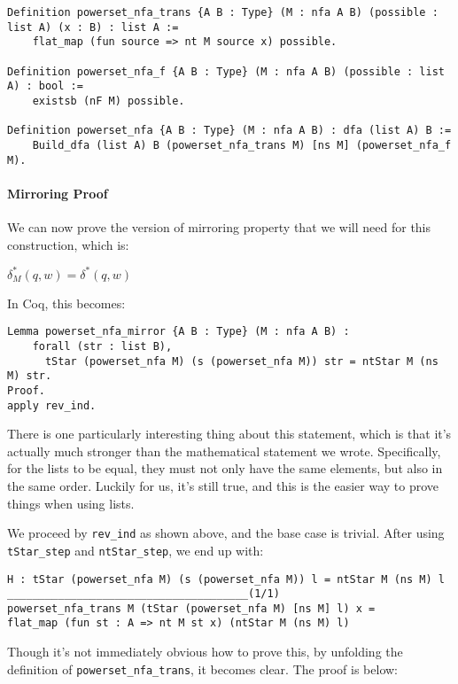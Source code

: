 \begin{verbatim}
Definition powerset_nfa_trans {A B : Type} (M : nfa A B) (possible : list A) (x : B) : list A :=
    flat_map (fun source => nt M source x) possible.

Definition powerset_nfa_f {A B : Type} (M : nfa A B) (possible : list A) : bool :=
    existsb (nF M) possible.

Definition powerset_nfa {A B : Type} (M : nfa A B) : dfa (list A) B :=
    Build_dfa (list A) B (powerset_nfa_trans M) [ns M] (powerset_nfa_f M).
\end{verbatim}

\paragraph{Mirroring Proof}

We can now prove the version of mirroring property that we will need for this construction, which is:

$\delta_M^*(q, w) = \delta^*(q, w)$

In Coq, this becomes:

\begin{verbatim}
Lemma powerset_nfa_mirror {A B : Type} (M : nfa A B) :
    forall (str : list B),
      tStar (powerset_nfa M) (s (powerset_nfa M)) str = ntStar M (ns M) str.
Proof.
apply rev_ind.
\end{verbatim}

There is one particularly interesting thing about this statement, which is that it's actually much stronger than the mathematical statement we wrote.
Specifically, for the lists to be equal, they must not only have the same elements, but also in the same order.
Luckily for us, it's still true, and this is the easier way to prove things when using lists.

We proceed by \texttt{rev_ind} as shown above, and the base case is trivial.
After using \texttt{tStar_step} and \texttt{ntStar_step}, we end up with:

\begin{verbatim}
H : tStar (powerset_nfa M) (s (powerset_nfa M)) l = ntStar M (ns M) l
______________________________________(1/1)
powerset_nfa_trans M (tStar (powerset_nfa M) [ns M] l) x =
flat_map (fun st : A => nt M st x) (ntStar M (ns M) l)
\end{verbatim}

Though it's not immediately obvious how to prove this, by unfolding the definition of \texttt{powerset_nfa_trans}, it becomes clear.
The proof is below:

